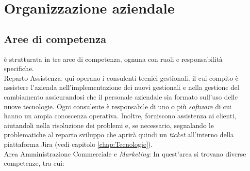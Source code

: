 \section{Organizzazione aziendale}
\subsection{Aree di competenza}
{\company} è strutturata in tre aree di competenza, ognuna con ruoli e responsabilità specifiche.\\
Reparto Assistenza: qui operano i consulenti tecnici gestionali, il cui compito è assistere l'azienda nell'implementazione dei nuovi gestionali 
e nella gestione del cambiamento assicurandosi che il personale aziendale sia formato sull'uso delle nuove tecnologie. Ogni consulente è responsabile di uno 
o più \textit{software} di cui hanno un ampia conoscenza operativa. Inoltre, forniscono assistenza ai clienti, aiutandoli 
nella risoluzione dei problemi e, se necessario, segnalando le problematiche al reparto sviluppo che aprirà quindi un 
\textit{ticket} all'interno della piattaforma Jira (vedi capitolo \ref{chap:Tecnologie}).\\
Area Amministrazione Commerciale e \textit{Marketing}: In quest'area si trovano diverse competenze, tra cui:
